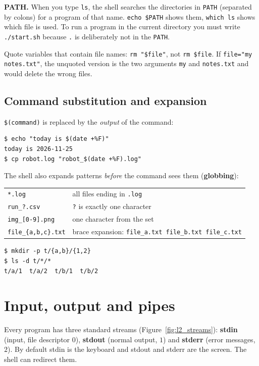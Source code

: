 \textbf{PATH.} When you type \texttt{ls}, the shell searches the directories in \texttt{PATH} (separated by colons) for a program of that name. \verb|echo $PATH| shows them, \verb|which ls| shows which file is used. To run a program in the current directory you must write \verb|./start.sh| because \verb|.| is deliberately not in the \texttt{PATH}.

\begin{keyidea}
Quote variables that contain file names: \verb|rm "$file"|, not \verb|rm $file|. If \texttt{file="my notes.txt"}, the unquoted version is the two arguments \texttt{my} and \texttt{notes.txt} and would delete the wrong files.
\end{keyidea}

\subsection*{Command substitution and expansion}
\verb|$(command)| is replaced by the \emph{output} of the command:
\begin{verbatim}
$ echo "today is $(date +%F)"
today is 2026-11-25
$ cp robot.log "robot_$(date +%F).log"
\end{verbatim}
The shell also expands patterns \emph{before} the command sees them (\textbf{globbing}):
\begin{center}
\renewcommand{\arraystretch}{1.2}
\begin{tabular}{ll}
\verb|*.log| & all files ending in \texttt{.log}\\
\verb|run_?.csv| & \texttt{?} is exactly one character\\
\verb|img_[0-9].png| & one character from the set\\
\verb|file_{a,b,c}.txt| & brace expansion: \texttt{file\_a.txt file\_b.txt file\_c.txt}\\
\end{tabular}
\end{center}
\begin{verbatim}
$ mkdir -p t/{a,b}/{1,2}
$ ls -d t/*/*
t/a/1  t/a/2  t/b/1  t/b/2
\end{verbatim}

\section*{Input, output and pipes}
Every program has three standard streams (Figure~\ref{fig:l2_streams}): \textbf{stdin} (input, file descriptor $0$), \textbf{stdout} (normal output, $1$) and \textbf{stderr} (error messages, $2$). By default stdin is the keyboard and stdout and stderr are the screen. The shell can redirect them.

